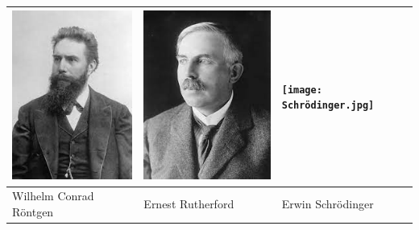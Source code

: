 \documentclass[a4paper]{scrartcl}
\begin{document}
\begin{aufgabe}[points={6}]
\begin{longtable}{|>{\centering\arraybackslash}p{4.2cm}|>{\centering\arraybackslash}p{4.2cm}|>{\centering\arraybackslash}p{4.2cm}|}
\includegraphics[scale=0.5]{Roentgen.jpg} & \includegraphics[scale=0.5]{Rutherford.jpg} & \texttt{[image: Schrödinger.jpg]} \\ 
	\hline 
	Wilhelm Conrad Röntgen & Ernest Rutherford & Erwin Schrödinger \\ 
	\hline 

\end{longtable}
\end{aufgabe}
\end{document}
